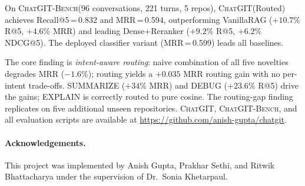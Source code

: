 \documentclass[runningheads]{llncs}
\newcommand{\chatgit}{\textsc{ChatGIT}\xspace}
\newcommand{\conv}{\textsc{ChatGIT-Bench}\xspace}
\begin{document}
On \conv (96 conversations, 221 turns, 5 repos), \chatgit (Routed) achieves
Recall@5\,=\,0.832 and MRR\,=\,0.594, outperforming VanillaRAG ($+10.7\%$
R@5, $+4.6\%$ MRR) and leading Dense+Reranker ($+9.2\%$ R@5, $+6.2\%$
NDCG@5). The deployed classifier variant (MRR\,=\,0.599) leads all baselines.

The core finding is \emph{intent-aware routing}: naive combination of all
five novelties degrades MRR ($-1.6\%$); routing yields a $+0.035$ MRR
routing gain with no per-intent trade-offs. SUMMARIZE ($+34\%$ MRR) and
DEBUG ($+23.6\%$ R@5) drive the gains; EXPLAIN is correctly routed to pure
cosine. The routing-gap finding replicates on five additional unseen
repositories. \chatgit, \conv, and all evaluation scripts are available at
\url{https://github.com/anish-gupta/chatgit}.

\paragraph{Acknowledgements.}
This project was implemented by Anish Gupta, Prakhar Sethi, and Ritwik
Bhattacharya under the supervision of Dr.~Sonia Khetarpaul.
\end{document}
